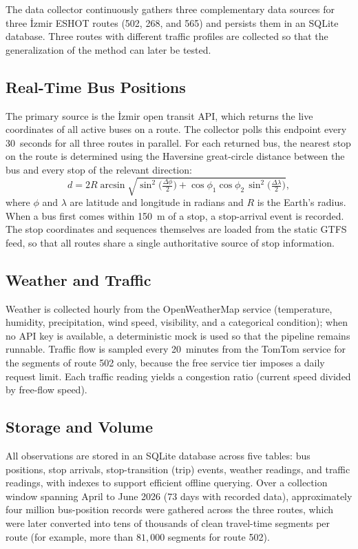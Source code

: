 The data collector continuously gathers three complementary data sources for three İzmir ESHOT routes (502, 268, and 565) and persists them in an SQLite database. Three routes with different traffic profiles are collected so that the generalization of the method can later be tested.

\subsection{Real-Time Bus Positions}

The primary source is the İzmir open transit API, which returns the live coordinates of all active buses on a route. The collector polls this endpoint every 30~seconds for all three routes in parallel. For each returned bus, the nearest stop on the route is determined using the Haversine great-circle distance between the bus and every stop of the relevant direction:
\begin{equation}
d = 2R \arcsin\!\sqrt{\sin^{2}\!\Big(\tfrac{\Delta\phi}{2}\Big) + \cos\phi_{1}\cos\phi_{2}\,\sin^{2}\!\Big(\tfrac{\Delta\lambda}{2}\Big)},
\end{equation}
where $\phi$ and $\lambda$ are latitude and longitude in radians and $R$ is the Earth's radius. When a bus first comes within 150~m of a stop, a stop-arrival event is recorded. The stop coordinates and sequences themselves are loaded from the static GTFS feed, so that all routes share a single authoritative source of stop information.

\subsection{Weather and Traffic}

Weather is collected hourly from the OpenWeatherMap service (temperature, humidity, precipitation, wind speed, visibility, and a categorical condition); when no API key is available, a deterministic mock is used so that the pipeline remains runnable. Traffic flow is sampled every 20~minutes from the TomTom service for the segments of route 502 only, because the free service tier imposes a daily request limit. Each traffic reading yields a congestion ratio (current speed divided by free-flow speed).

\subsection{Storage and Volume}

All observations are stored in an SQLite database across five tables: bus positions, stop arrivals, stop-transition (trip) events, weather readings, and traffic readings, with indexes to support efficient offline querying. Over a collection window spanning April to June 2026 (73 days with recorded data), approximately four million bus-position records were gathered across the three routes, which were later converted into tens of thousands of clean travel-time segments per route (for example, more than $81{,}000$ segments for route 502).

